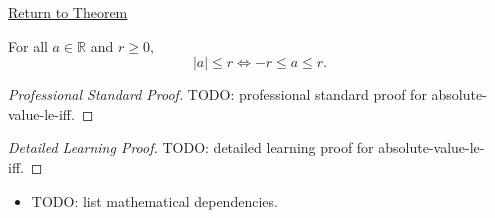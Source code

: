 \newpage
{}
\label{prf:absolute-value-le-iff}

\begin{remark*}[Return]
\hyperref[thm:absolute-value-le-iff]{Return to Theorem}
\end{remark*}

\begin{theorem*}
For all $a \in \mathbb{R}$ and $r \ge 0$,
\[
  \lvert a \rvert \le r \iff -r \le a \le r.
\]
\end{theorem*}

\begin{proof}[Professional Standard Proof]
\LRAProofBodyStart
TODO: professional standard proof for absolute-value-le-iff.
\end{proof}

\begin{proof}[Detailed Learning Proof]
\LRAProofBodyStart
TODO: detailed learning proof for absolute-value-le-iff.
\end{proof}

\begin{remark*}
\end{remark*}

\begin{dependencies}
\begin{itemize}
  \item TODO: list mathematical dependencies.
\end{itemize}
\end{dependencies}

\clearpage
